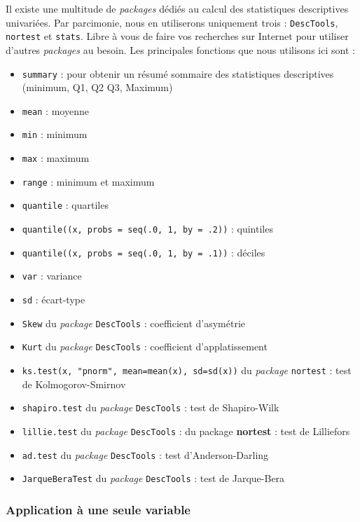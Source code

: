 \documentclass[
  11pt,
  french,
]{book}
\providecommand{\tightlist}{%
  \setlength{\itemsep}{0pt}\setlength{\parskip}{0pt}}
\begin{document}
Il existe une multitude de \emph{packages} dédiés au calcul des statistiques descriptives univariées. Par parcimonie, nous en utiliserons uniquement trois : \texttt{DescTools}, \texttt{nortest} et \texttt{stats}. Libre à vous de faire vos recherches sur Internet pour utiliser d'autres \emph{packages} au besoin. Les principales fonctions que nous utilisons ici sont :

\begin{itemize}
\tightlist
\item
  \texttt{summary} : pour obtenir un résumé sommaire des statistiques descriptives (minimum, Q1, Q2 Q3, Maximum)
\item
  \texttt{mean} : moyenne
\item
  \texttt{min} : minimum
\item
  \texttt{max} : maximum
\item
  \texttt{range} : minimum et maximum
\item
  \texttt{quantile} : quartiles
\item
  \texttt{quantile((x,\ probs\ =\ seq(.0,\ 1,\ by\ =\ .2))} : quintiles
\item
  \texttt{quantile((x,\ probs\ =\ seq(.0,\ 1,\ by\ =\ .1))} : déciles
\item
  \texttt{var} : variance
\item
  \texttt{sd} : écart-type
\item
  \texttt{Skew} du \emph{package} \texttt{DescTools} : coefficient d'asymétrie
\item
  \texttt{Kurt} du \emph{package} \texttt{DescTools} : coefficient d'applatissement
\item
  \texttt{ks.test(x,\ "pnorm",\ mean=mean(x),\ sd=sd(x))} du \emph{package} \texttt{nortest} : test de Kolmogorov-Smirnov
\item
  \texttt{shapiro.test} du \emph{package} \texttt{DescTools} : test de Shapiro-Wilk
\item
  \texttt{lillie.test} du \emph{package} \texttt{DescTools} : du package \textbf{nortest} : test de Lilliefors
\item
  \texttt{ad.test} du \emph{package} \texttt{DescTools} : test d'Anderson-Darling
\item
  \texttt{JarqueBeraTest} du \emph{package} \texttt{DescTools} : test de Jarque-Bera
\end{itemize}

\hypertarget{sect02561}{%
\subsubsection{Application à une seule variable}\label{sect02561}}
\end{document}
